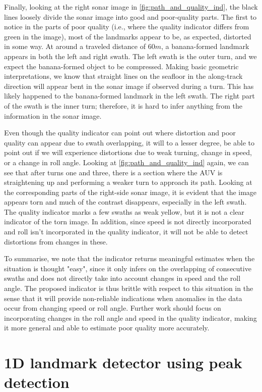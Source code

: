 Finally, looking at the right sonar image in \cref{fig:path_and_quality_ind}, the black lines loosely divide the sonar image into good and poor-quality parts. The first to notice in the parts of poor quality (i.e., where the quality indicator differs from green in the image), most of the landmarks appear to be, as expected, distorted in some way. At around a traveled distance of $60 m$, a banana-formed landmark appears in both the left and right swath. The left swath is the outer turn, and we expect the banana-formed object to be compressed. Making basic geometric interpretations, we know that straight lines on the seafloor in the along-track direction will appear bent in the sonar image if observed during a turn. This has likely happened to the banana-formed landmark in the left swath. The right part of the swath is the inner turn; therefore, it is hard to infer anything from the information in the sonar image.

Even though the quality indicator can point out where distortion and poor quality can appear due to swath overlapping, it will to a lesser degree, be able to point out if we will experience distortions due to weak turning, change in speed, or a change in roll angle. Looking at \cref{fig:path_and_quality_ind} again, we can see that after turns one and three, there is a section where the AUV is straightening up and performing a weaker turn to approach its path. Looking at the corresponding parts of the right-side sonar image, it is evident that the image appears torn and much of the contrast disappears, especially in the left swath. The quality indicator marks a few swaths as weak yellow, but it is not a clear indicator of the torn image. In addition, since speed is not directly incorporated and roll isn't incorporated in the quality indicator, it will not be able to detect distortions from changes in these.

To summarise, we note that the indicator returns meaningful estimates when the situation is thought "easy", since it only infers on the overlapping of consecutive swaths and does not directly take into account changes in speed and the roll angle. The proposed indicator is thus brittle with respect to this situation in the sense that it will provide non-reliable indications when anomalies in the data occur from changing speed or roll angle. Further work should focus on incorporating changes in the roll angle and speed in the quality indicator, making it more general and able to estimate poor quality more accurately. 

\section{1D landmark detector using peak detection} \label{sec:disc_1D_landmark_detector}

